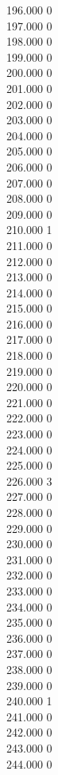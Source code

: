 { 196.000	0 \\
 197.000	0 \\
 198.000	0 \\
 199.000	0 \\
 200.000	0 \\
 201.000	0 \\
 202.000	0 \\
 203.000	0 \\
 204.000	0 \\
 205.000	0 \\
 206.000	0 \\
 207.000	0 \\
 208.000	0 \\
 209.000	0 \\
 210.000	1 \\
 211.000	0 \\
 212.000	0 \\
 213.000	0 \\
 214.000	0 \\
 215.000	0 \\
 216.000	0 \\
 217.000	0 \\
 218.000	0 \\
 219.000	0 \\
 220.000	0 \\
 221.000	0 \\
 222.000	0 \\
 223.000	0 \\
 224.000	0 \\
 225.000	0 \\
 226.000	3 \\
 227.000	0 \\
 228.000	0 \\
 229.000	0 \\
 230.000	0 \\
 231.000	0 \\
 232.000	0 \\
 233.000	0 \\
 234.000	0 \\
 235.000	0 \\
 236.000	0 \\
 237.000	0 \\
 238.000	0 \\
 239.000	0 \\
 240.000	1 \\
 241.000	0 \\
 242.000	0 \\
 243.000	0 \\
 244.000	0 \\
}

